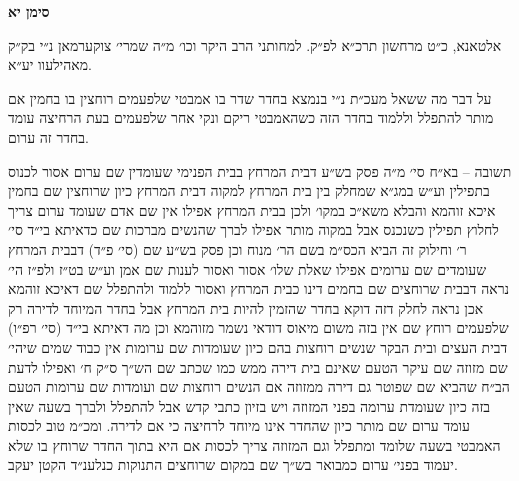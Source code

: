 \documentclass[12pt, openany]{book}
\newcommand{\chapname}{}
\newcommand{\newchap}[1]{
	\addcontentsline{toc}{chapter}{#1}
	\renewcommand{\chapname}{#1}
		\begin{center}
			\textbf{%
\fontsize{16pt}{16pt}\selectfont
				#1}
		\end{center}
}
\begin{document}
\newchap{סימן יא}
\begin{multicols}{2}
אלטאנא, כ״ט מרחשון תרכ״א לפ״ק. למחותני הרב היקר וכו׳ מ״ה שמרי׳ צוקערמאן נ״י בק״ק מאהילעוו יע״א.\\\vspace{0pt}

על דבר מה ששאל מעכ״ת נ״י בנמצא בחדר שדר בו אמבטי שלפעמים רוחצין בו בחמין אם מותר להתפלל וללמוד בחדר הזה כשהאמבטי ריקם ונקי אחר שלפעמים בעת הרחיצה עומד בחדר זה ערום.\\\vspace{0pt}

תשובה – בא״ח סי׳ מ״ה פסק בש״ע דבית המרחץ בבית הפנימי שעומדין שם ערום אסור לכנוס בתפילין וע״ש במג״א שמחלק בין בית המרחץ למקוה דבית המרחץ כיון שרוחצין שם בחמין איכא זוהמא והבלא משא״כ במקו׳ ולכן בבית המרחץ אפילו אין שם אדם שעומד ערום צריך לחלוץ תפילין כשנכנס אבל במקוה מותר אפילו לברך שהנשים מברכות שם כדאיתא בי״ד סי׳ ר׳ וחילוק זה הביא הכס״מ בשם הר׳ מנוח וכן פסק בש״ע שם (סי׳ פ״ד) דבבית המרחץ שעומדים שם ערומים אפילו שאלת שלו׳ אסור ואסור לענות שם אמן וע״ש בט״ז ולפ״ז הי׳ נראה דבבית שרוחצים שם בחמים דינו כבית המרחץ ואסור ללמוד ולהתפלל שם דאיכא זוהמא אכן נראה לחלק דזה דוקא בחדר שהזמין להיות בית המרחץ אבל בחדר המיוחד לדירה רק שלפעמים רוחץ שם אין בזה משום מיאוס דודאי נשמר מזוהמא וכן מה דאיתא בי״ד (סי׳ רפ״ו) דבית העצים ובית הבקר שנשים רוחצות בהם כיון שעומדות שם ערומות אין כבוד שמים שיהי׳ שם מזוזה שם עיקר הטעם שאינם בית דירה ממש כמו שכתב שם הש״ך ס״ק ח׳ ואפילו לדעת הב״ח שהביא שם שפוטר גם דירה ממזוזה אם הנשים רוחצות שם ועומדות שם ערומות הטעם בזה כיון שעומדת ערומה בפני המזוזה ויש בזיון כתבי קדש אבל להתפלל ולברך בשעה שאין עומד ערום שם מותר כיון שהחדר אינו מיוחד לרחיצה כי אם לדירה. ומכ״מ טוב לכסות האמבטי בשעה שלומד ומתפלל וגם המזוזה צריך לכסות אם היא בתוך החדר שרוחץ בו שלא יעמוד בפני׳ ערום כמבואר בש״ך שם במקום שרוחצים התנוקות כנלענ״ד הקטן יעקב.\\\vspace{0pt}

\end{multicols}\newpage
\end{document}
